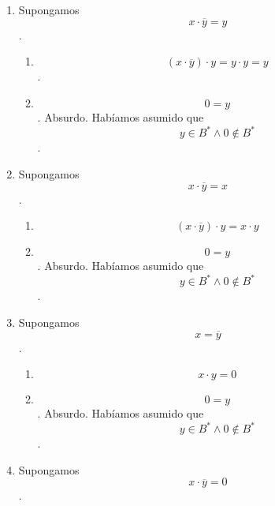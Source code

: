 \begin{enumerate}
\begin{enumerate}
\begin{enumerate}
\begin{enumerate}
        \begin{enumerate}
        \def\labelenumv{\arabic{enumv}.}
        \item
          Supongamos \[{x \cdot \overline{y}} = y\].

          \begin{enumerate}
          \def\labelenumvi{\arabic{enumvi}.}
          \tightlist
          \item
            \[{{{({x \cdot \overline{y}})} \cdot y} = {y \cdot y}} = y\].
          \item
            \[0 = y\]. Absurdo. Habíamos asumido que
            \[{y \in {B^{\ast} \land 0}} \notin B^{\ast}\].
          \end{enumerate}
        \item
          Supongamos \[{x \cdot \overline{y}} = x\].

          \begin{enumerate}
          \def\labelenumvi{\arabic{enumvi}.}
          \tightlist
          \item
            \[{{({x \cdot \overline{y}})} \cdot y} = {x \cdot y}\]
          \item
            \[0 = y\]. Absurdo. Habíamos asumido que
            \[{y \in {B^{\ast} \land 0}} \notin B^{\ast}\].
          \end{enumerate}
        \item
          Supongamos \[x = \overline{y}\].

          \begin{enumerate}
          \def\labelenumvi{\arabic{enumvi}.}
          \tightlist
          \item
            \[{x \cdot y} = 0\]
          \item
            \[0 = y\]. Absurdo. Habíamos asumido que
            \[{y \in {B^{\ast} \land 0}} \notin B^{\ast}\].
          \end{enumerate}
        \item
          Supongamos \[{x \cdot \overline{y}} = 0\].


\end{enumerate}
\end{enumerate}
\end{enumerate}
\end{enumerate}
\end{enumerate}
